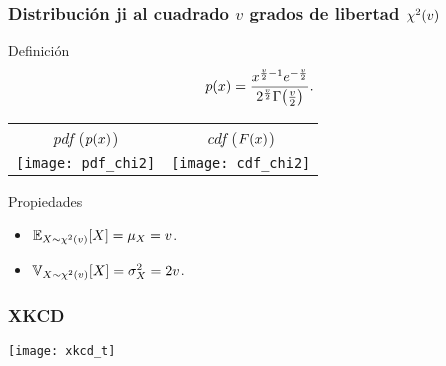 \documentclass[table]{beamer}
\begin{document}
\begin{frame}
    \frametitle{Distribución ji al cuadrado $v$ grados de libertad $\chidist{v}$}
    \begin{block}{Definición}
        \begin{equation*}
            \pdf{x} = \frac{x^{\frac{v}{2} - 1} e^{- \frac{v}{2}}}{2^{\frac{v}{2}} \gammafunc{\frac{v}{2}}} .
        \end{equation*}
    \end{block}
    \begin{center}
        \begin{tabular}{cc}
            \emph{pdf} ($\pdf{x}$) & \emph{cdf} ($\FF{x}$) \\
            \texttt{[image: pdf\_chi2]} &
            \texttt{[image: cdf\_chi2]} \\
        \end{tabular}
    \end{center}
    \begin{block}{Propiedades}
        \begin{itemize}
            \item $\expecteddist{X \sim \chidist{v}}{X} = \mu_{X} = v$.
            \item $\variancedist{X \sim \chidist{v}}{X} = \sigma^{2}_{X} = 2 v$.
        \end{itemize}
    \end{block}
\end{frame}

\begin{frame}
    \frametitle{XKCD}
    \begin{center}
        \texttt{[image: xkcd\_t]}
    \end{center}
\end{frame}
\end{document}
